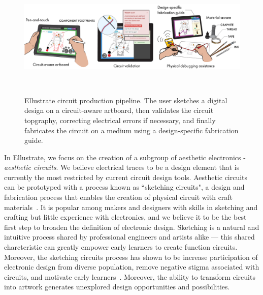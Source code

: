 \documentclass{sigchi}
\begin{document}
\begin{figure}[ht]
 \vspace{-16pt}
\centering
  \includegraphics[width=\linewidth]{figures/ellustrate_system.pdf}
  \caption{Ellustrate circuit production pipeline. The user sketches a digital design on a circuit-aware artboard, then validates the circuit topgraphy, correcting electrical errors if necessary, and finally fabricates the circuit on a medium using a design-specific fabrication guide.}~\label{fig:process_flow}
  \vspace{-16pt}
\end{figure}

In Ellustrate, we focus on the creation of a subgroup of aesthetic electronics - \textit{aesthetic circuits}. We believe electrical traces to be a design element that is currently the most restricted by current circuit design tools. Aesthetic circuits can be prototyped with a process known as ``sketching circuits", a design and fabrication process that enables the creation of physical circuit with craft materials~\cite{qi_sketching_2014}. It is popular among makers and designers with skills in sketching and crafting but little experience with electronics, and we believe it to be the best first step to broaden the definition of electronic design. Sketching is a natural and intuitive process shared by professional engineers and artists alike --- this shared charcteristic can greatly empower early learners to create function circuits. Moreover, the sketching circuits process has shown to be increase participation of electronic design from diverse population, remove negative stigma associated with circuits, and motivate early learners~\cite{qi_stickers_2015}. Moreover, the ability to transform circuits into artwork generates unexplored design opportunities and possibilities. 

\end{document}
